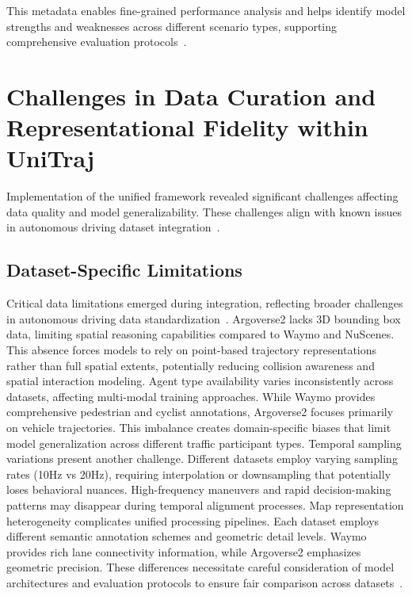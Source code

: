 This metadata enables fine-grained performance analysis and helps identify model strengths and weaknesses across different scenario types, supporting comprehensive evaluation protocols~\cite{unitrajFeng2024}.

\section{Challenges in Data Curation and Representational Fidelity within UniTraj}
\label{sec:data_challenges}

Implementation of the unified framework revealed significant challenges affecting data quality and model generalizability. These challenges align with known issues in autonomous driving dataset integration~\cite{metadriveLi2022, scenarionetLi2023}.

\subsection{Dataset-Specific Limitations}
\label{ssec:dataset_limitations}

Critical data limitations emerged during integration, reflecting broader challenges in autonomous driving data standardization~\cite{hu2023planning}. Argoverse2 lacks 3D bounding box data, limiting spatial reasoning capabilities compared to Waymo and NuScenes. This absence forces models to rely on point-based trajectory representations rather than full spatial extents, potentially reducing collision awareness and spatial interaction modeling.
Agent type availability varies inconsistently across datasets, affecting multi-modal training approaches. While Waymo provides comprehensive pedestrian and cyclist annotations, Argoverse2 focuses primarily on vehicle trajectories. This imbalance creates domain-specific biases that limit model generalization across different traffic participant types.
Temporal sampling variations present another challenge. Different datasets employ varying sampling rates (10Hz vs 20Hz), requiring interpolation or downsampling that potentially loses behavioral nuances. High-frequency maneuvers and rapid decision-making patterns may disappear during temporal alignment processes.
Map representation heterogeneity complicates unified processing pipelines. Each dataset employs different semantic annotation schemes and geometric detail levels. Waymo provides rich lane connectivity information, while Argoverse2 emphasizes geometric precision. These differences necessitate careful consideration of model architectures and evaluation protocols to ensure fair comparison across datasets~\cite{unitrajFeng2024}.

